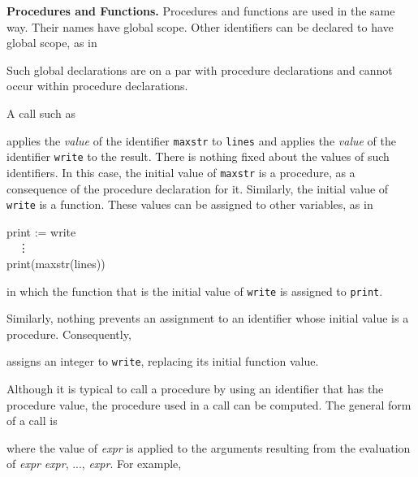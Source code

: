 \textbf{Procedures and Functions.} Procedures and functions are used
in the same way. Their names have global scope.  Other identifiers can
be declared to have global scope, as in


Such global declarations are on a par with procedure declarations and
cannot occur within procedure declarations.

A call such as


\noindent
applies the \textit{value} of the identifier \texttt{maxstr} to
\texttt{lines} and applies the \textit{value} of the identifier
\texttt{write} to the result. There is nothing fixed about the values
of such identifiers. In this case, the initial value of
\texttt{maxstr} is a procedure, as a consequence of the procedure
declaration for it. Similarly, the initial value of \texttt{write} is
a function. These values can be assigned to other variables, as in

\begin{iconcode}
\>print := write\\
\>\>\>\ \ \vdots\\
\>print(maxstr(lines))
\end{iconcode}

\noindent in which the function that is the initial value of
\texttt{write} is assigned to \texttt{print}.

Similarly, nothing prevents an assignment to an identifier whose
initial value is a procedure. Consequently,


\noindent
assigns an integer to \texttt{write}, replacing its initial function value.

Although it is typical to call a procedure by using an identifier that
has the procedure value, the procedure used in a call can be
computed. The general form of a call is


\noindent where the value of
\textit{expr} is applied to the
arguments resulting from the evaluation of
\textit{expr}
\textit{expr}, ...,
\textit{expr}. For example,

